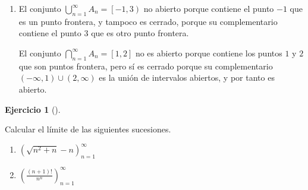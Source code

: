\documentclass[
  spanish,
  a4paper,
]{scrreport}
\providecommand{\tightlist}{%
  \setlength{\itemsep}{0pt}\setlength{\parskip}{0pt}}
\theoremstyle{definition}
\newtheorem{exercise}{Ejercicio}[chapter]
\theoremstyle{remark}
\begin{document}
\begin{tcolorbox}
\begin{enumerate}
  Para el conjunto \(\bigcap_{n=1}^{\infty} A_n = [1, 2]\), al tratarse
  de un intervalo cerrado, los puntos interiores son todos los puntos
  del intervalo \((1, 2)\), los puntos frontera son \(1\) y \(2\), y los
  puntos exteriores son los del conjunto
  \((-\infty, 1) \cup (2, \infty)\).
\item
  El conjunto \(\bigcup_{n=1}^{\infty} A_n = \left[-1, 3\right)\) no
  abierto porque contiene el punto \(-1\) que es un punto frontera, y
  tampoco es cerrado, porque su complementario contiene el punto \(3\)
  que es otro punto frontera.

  El conjunto \(\bigcap_{n=1}^{\infty} A_n = [1, 2]\) no es abierto
  porque contiene los puntos \(1\) y \(2\) que son puntos frontera, pero
  sí es cerrado porque su complementario
  \((-\infty, 1) \cup (2, \infty)\) es la unión de intervalos abiertos,
  y por tanto es abierto.
\end{enumerate}

\end{tcolorbox}

\begin{exercise}[]\protect\hypertarget{exr-2}{}\label{exr-2}

Calcular el límite de las siguientes sucesiones.

\begin{enumerate}
\def\labelenumi{\alph{enumi}.}
\tightlist
\item
  \(\left(\sqrt{n^2+n}-n\right)_{n=1}^\infty\)
\item
  \(\left(\frac{(n+1)!}{n^n}\right)_{n=1}^\infty\)
\end{enumerate}

\end{exercise}
\end{document}
